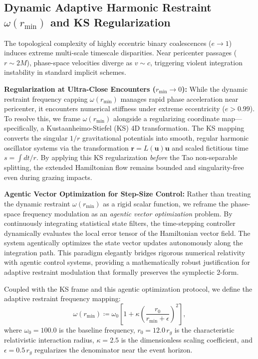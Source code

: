 \documentclass[11pt,a4paper,reqno]{article}
\theoremstyle{plain}
\theoremstyle{definition}
\theoremstyle{remark}
\numberwithin{equation}{section}
\begin{document}
\subsection{Dynamic Adaptive Harmonic Restraint \texorpdfstring{$\omega(r_{\min})$}{omega(r\_min)} and KS Regularization}
\label{subsec:adaptive_restraint}
The topological complexity of highly eccentric binary coalescences ($e \to 1$) induces extreme multi-scale timescale disparities. Near pericenter passages ($r \sim 2M$), phase-space velocities diverge as $v \sim c$, triggering violent integration instability in standard implicit schemes. 

\textbf{Regularization at Ultra-Close Encounters ($r_{\min} \to 0$):} While the dynamic restraint frequency capping $\omega(r_{\min})$ manages rapid phase acceleration near pericenter, it encounters numerical stiffness under extreme eccentricity ($e > 0.99$). To resolve this, we frame $\omega(r_{\min})$ alongside a regularizing coordinate map—specifically, a Kustaanheimo-Stiefel (KS) 4D transformation. The KS mapping converts the singular $1/r$ gravitational potentials into smooth, regular harmonic oscillator systems via the transformation $\bm{r} = L(\bm{u})\bm{u}$ and scaled fictitious time $s = \int dt / r$. By applying this KS regularization \textit{before} the Tao non-separable splitting, the extended Hamiltonian flow remains bounded and singularity-free even during grazing impacts.

\textbf{Agentic Vector Optimization for Step-Size Control:} Rather than treating the dynamic restraint $\omega(r_{\min})$ as a rigid scalar function, we reframe the phase-space frequency modulation as an \textit{agentic vector optimization} problem. By continuously integrating statistical state filters, the time-stepping controller dynamically evaluates the local error tensor of the Hamiltonian vector field. The system agentically optimizes the state vector updates autonomously along the integration path. This paradigm elegantly bridges rigorous numerical relativity with agentic control systems, providing a mathematically robust justification for adaptive restraint modulation that formally preserves the symplectic 2-form.

Coupled with the KS frame and this agentic optimization protocol, we define the adaptive restraint frequency mapping:
\begin{equation}
\omega(r_{\min}) \coloneqq \omega_0 \left[ 1 + \kappa \left( \frac{r_0}{r_{\min} + \epsilon} \right)^2 \right],
\label{eq:adaptive_omega}
\end{equation}
where $\omega_0 = 100.0$ is the baseline frequency, $r_0 = 12.0 \, r_g$ is the characteristic relativistic interaction radius, $\kappa = 2.5$ is the dimensionless scaling coefficient, and $\epsilon = 0.5 \, r_g$ regularizes the denominator near the event horizon.
\end{document}
